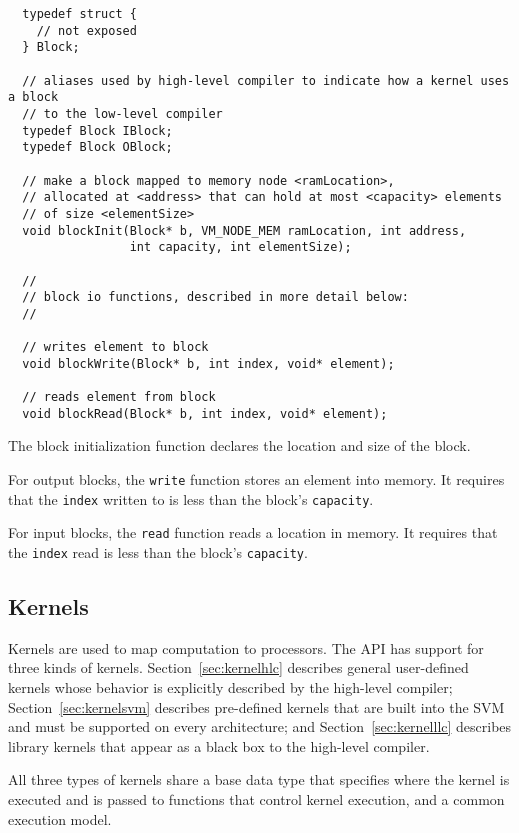 {\small
\begin{verbatim}
  typedef struct {
    // not exposed
  } Block;

  // aliases used by high-level compiler to indicate how a kernel uses a block
  // to the low-level compiler
  typedef Block IBlock;
  typedef Block OBlock;

  // make a block mapped to memory node <ramLocation>, 
  // allocated at <address> that can hold at most <capacity> elements
  // of size <elementSize>
  void blockInit(Block* b, VM_NODE_MEM ramLocation, int address, 
                 int capacity, int elementSize);

  //
  // block io functions, described in more detail below:
  //

  // writes element to block
  void blockWrite(Block* b, int index, void* element);

  // reads element from block
  void blockRead(Block* b, int index, void* element); \end{verbatim}}

 The block initialization function declares the location and size of the block.


 For output blocks, the {\tt write} function stores an element into memory.  It requires that the {\tt index} written to is less than the block's {\tt capacity}.  

 For input blocks, the {\tt read} function reads a location in memory.  It requires that the {\tt index} read is less than the block's {\tt capacity}.

\subsection{Kernels}
\label{sec:kernel}

Kernels are used to map computation to processors. 
The API has support for three kinds of kernels. Section~\ref{sec:kernelhlc} describes general user-defined kernels whose behavior is explicitly described by the high-level compiler; Section~\ref{sec:kernelsvm} describes pre-defined kernels that are built into the SVM and must be supported on every architecture; and Section~\ref{sec:kernelllc} describes library kernels that appear as a black box to the high-level compiler. 

All three types of kernels share a base data type that 
specifies where the kernel is executed and is passed to functions that control kernel execution, and a common execution model.

